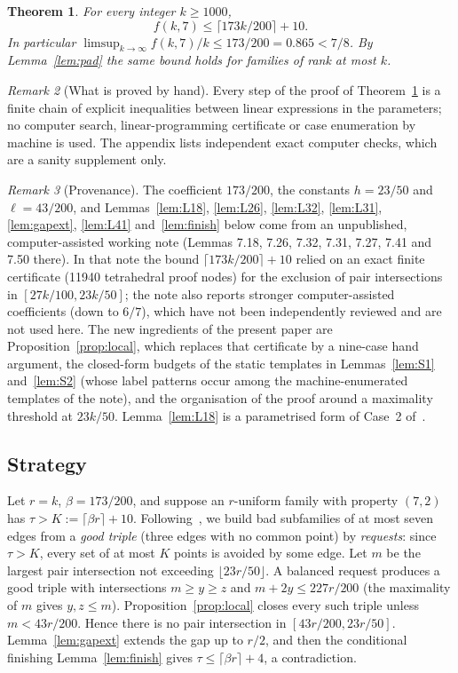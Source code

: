 \documentclass[11pt]{amsart}
\newtheorem{theorem}{Theorem}[section]
\theoremstyle{definition}
\theoremstyle{remark}
\newtheorem{remark}[theorem]{Remark}
\newcommand{\ceil}[1]{\lceil #1\rceil}
\newcommand{\floor}[1]{\lfloor #1\rfloor}
\begin{document}
\begin{theorem}\label{thm:main}
For every integer $k\ge1000$,
\[
f(k,7)\le\ceil{173k/200}+10 .
\]
In particular $\limsup_{k\to\infty}f(k,7)/k\le173/200=0.865<7/8$. By Lemma~\ref{lem:pad} the same bound holds for families of rank at most $k$.
\end{theorem}

\begin{remark}[What is proved by hand]
Every step of the proof of Theorem~\ref{thm:main} is a finite chain of explicit inequalities between linear expressions in the parameters; no computer search, linear-programming certificate or case enumeration by machine is used. The appendix lists independent exact computer checks, which are a sanity supplement only.
\end{remark}

\begin{remark}[Provenance]\label{rem:prov}
The coefficient $173/200$, the constants $h=23/50$ and $\ell=43/200$, and Lemmas~\ref{lem:L18}, \ref{lem:L26}, \ref{lem:L32}, \ref{lem:L31}, \ref{lem:gapext}, \ref{lem:L41} and~\ref{lem:finish} below come from an unpublished, computer-assisted working note (Lemmas 7.18, 7.26, 7.32, 7.31, 7.27, 7.41 and 7.50 there). In that note the bound $\ceil{173k/200}+10$ relied on an exact finite certificate (11940 tetrahedral proof nodes) for the exclusion of pair intersections in $[27k/100,23k/50]$; the note also reports stronger computer-assisted coefficients (down to $6/7$), which have not been independently reviewed and are not used here. The new ingredients of the present paper are Proposition~\ref{prop:local}, which replaces that certificate by a nine-case hand argument, the closed-form budgets of the static templates in Lemmas~\ref{lem:S1} and~\ref{lem:S2} (whose label patterns occur among the machine-enumerated templates of the note), and the organisation of the proof around a maximality threshold at $23k/50$. Lemma~\ref{lem:L18} is a parametrised form of Case~2 of~\cite[Lemma~1]{FKW}.
\end{remark}

\subsection*{Strategy}
Let $r=k$, $\beta=173/200$, and suppose an $r$-uniform family with property $(7,2)$ has $\tau>K:=\ceil{\beta r}+10$. Following~\cite{FKW}, we build bad subfamilies of at most seven edges from a \emph{good triple} (three edges with no common point) by \emph{requests}: since $\tau>K$, every set of at most $K$ points is avoided by some edge. Let $m$ be the largest pair intersection not exceeding $\floor{23r/50}$. A balanced request produces a good triple with intersections $m\ge y\ge z$ and $m+2y\le227r/200$ (the maximality of $m$ gives $y,z\le m$). Proposition~\ref{prop:local} closes every such triple unless $m<43r/200$. Hence there is no pair intersection in $[43r/200,23r/50]$. Lemma~\ref{lem:gapext} extends the gap up to $r/2$, and then the conditional finishing Lemma~\ref{lem:finish} gives $\tau\le\ceil{\beta r}+4$, a contradiction.
\end{document}
